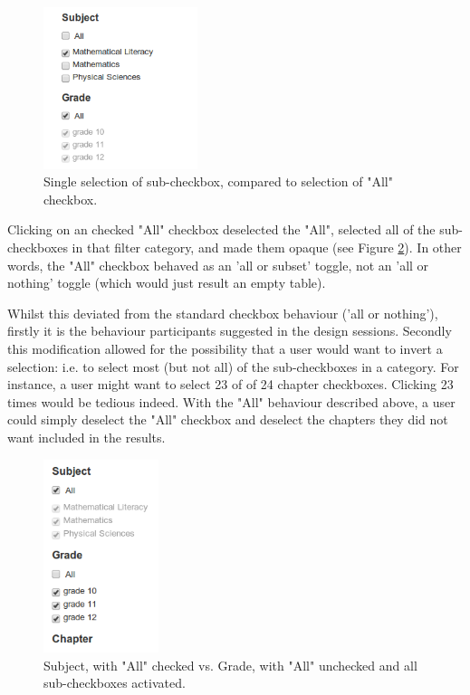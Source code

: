 \begin{figure}[h!]
    \centering
    \includegraphics[width=0.4\textwidth]{Figures/V1/checkboxes.png}
 \caption{Single selection of sub-checkbox, compared to selection of "All" checkbox.}
 \label{fig:checkboxes1}
\end{figure}

Clicking on an checked "All" checkbox deselected the "All", selected all of the sub-checkboxes in that filter category, and made them opaque (see Figure \ref{fig:checkboxes2}). In other words, the "All" checkbox behaved as an 'all or subset' toggle, not an 'all or nothing' toggle (which would just result an empty table). 

Whilst this deviated from the standard checkbox behaviour ('all or nothing'), firstly it is the behaviour participants suggested in the design sessions. Secondly \citep[p. 435]{Galitz} this modification allowed for the possibility that a user would want to invert a selection: i.e. to select most (but not all) of the sub-checkboxes in a category. For instance, a user might want to select 23 of of 24 chapter checkboxes. Clicking 23 times would be tedious indeed. With the "All" behaviour described above, a user could simply deselect the "All" checkbox and deselect the chapters they did not want included in the results.

\begin{figure}[h!]
    \centering
    \includegraphics[width=0.3\textwidth]{Figures/V1/alldeselected1.PNG}
 \caption{Subject, with "All" checked vs. Grade, with "All" unchecked and all sub-checkboxes activated.}
 \label{fig:checkboxes2}
\end{figure}

